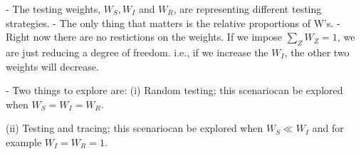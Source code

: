 - The testing weights, $W_S, W_I$ and $W_R$, are representing different testing strategies.
- The only thing that matters is the relative proportions of W's.
- Right now there are no restictions on the weights. If we impose $\sum_Z W_Z=1$, we are just reducing a degree of freedom. i.e., if we increase the $W_I$, the other two weights will decrease.

- Two things to explore are: 
(i) Random testing; this scenariocan be explored when $W_S=W_I=W_R$.

(ii) Testing and tracing; this scenariocan be explored when $W_S \ll W_I$ and for example $W_I=W_R=1$.
